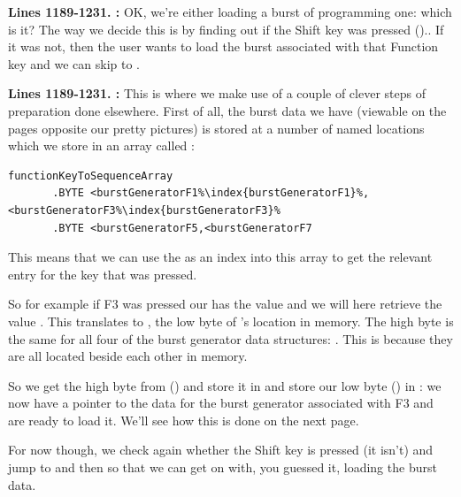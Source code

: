 \textbf{Lines 1189-1231. :} OK, we're either loading a burst of programming one: which is it?
The way we decide this is by finding out if the Shift key was pressed ().. If it was not, then the user wants to load the burst associated with
that Function key and we can skip to .

\textbf{Lines 1189-1231. :} This is where we make use of a couple of clever steps of preparation
done elsewhere. First of all, the burst data we have (viewable on the pages opposite our pretty pictures) is stored at a number of named locations
which we store in an array called :
\begin{lstlisting}[escapechar=\%]
functionKeyToSequenceArray
       .BYTE <burstGeneratorF1%\index{burstGeneratorF1}%,<burstGeneratorF3%\index{burstGeneratorF3}%
       .BYTE <burstGeneratorF5,<burstGeneratorF7
\end{lstlisting}
This means that we can use the  as an index into this array to get the relevant entry for the key that was pressed. 

So for example if F3 was pressed our  has the value  and we will here retrieve the value . This
translates to , the low byte of 's location in memory. The high byte is the same for all four of the burst generator
data structures: . This is because they are all located beside each other in memory.

 So we get the high byte from  ()
and store it in  and store our low byte () in : we now have a pointer to the data for the burst generator
associated with F3 and are ready to load it. We'll see how this is done on the next page. 

For now though, we check again whether the Shift key is pressed (it isn't) and jump to  and then  so that we
can get on with, you guessed it, loading the burst data.

